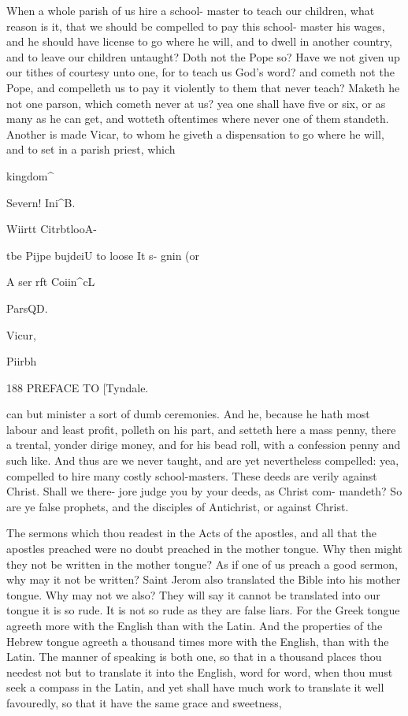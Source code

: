 \documentclass{custom}
\begin{document}
When a whole parish of us hire a school-
master to teach our children, what reason is it, 
that we should be compelled to pay this school- 
master his wages, and he should have license to 
go where he will, and to dwell in another country, 
and to leave our children untaught? Doth not 
the Pope so? Have we not given up our tithes 
of courtesy unto one, for to teach us God's 
word? and cometh not the Pope, and compelleth 
us to pay it violently to them that never teach? 
Maketh he not one parson, which cometh never 
at us? yea one shall have five or six, or as many 
as he can get, and wotteth oftentimes where 
never one of them standeth. Another is made 
Vicar, to whom he giveth a dispensation to go 
where he will, and to set in a parish priest, which 

kingdom^ 

Severn! 
Ini^B. 

Wiirtt 
CitrbtlooA- 

tbe Pijpe 
bujdeiU to 
loose It s- 
gnin (or 

A ser rft 
Coiin^cL 

ParsQD. 

Vicur, 

Piirbh 


188 
PREFACE TO 
[Tyndale.

can but minister a sort of dumb ceremonies. 
And he, because he hath most labour and least 
profit, polleth on his part, and setteth here a mass 
penny, there a trental, yonder dirige money,
and for his bead roll, with a confession penny and 
such like. And thus are we never taught, and 
are yet nevertheless compelled: yea, compelled 
to hire many costly school-masters. These 
deeds are verily against Christ. Shall we there- 
jore judge you by your deeds, as Christ com- 
mandeth? So are ye false prophets, and the 
disciples of Antichrist, or against Christ. 

The sermons which thou readest in the Acts 
of the apostles, and all that the apostles preached 
were no doubt preached in the mother tongue. 
Why then might they not be written in the 
mother tongue? As if one of us preach a good 
sermon, why may it not be written? Saint 
Jerom also translated the Bible into his mother 
tongue. Why may not we also? They will say 
it cannot be translated into our tongue it is so 
rude. It is not so rude as they are false liars.
For the Greek tongue agreeth more with the 
English than with the Latin. And the properties 
of the Hebrew tongue agreeth a thousand times 
more with the English, than with the Latin. The 
manner of speaking is both one, so that in a 
thousand places thou needest not but to translate 
it into the English, word for word, when thou 
must seek a compass in the Latin, and yet shall
have much work to translate it well favouredly, 
so that it have the same grace and sweetness,
\end{document}
